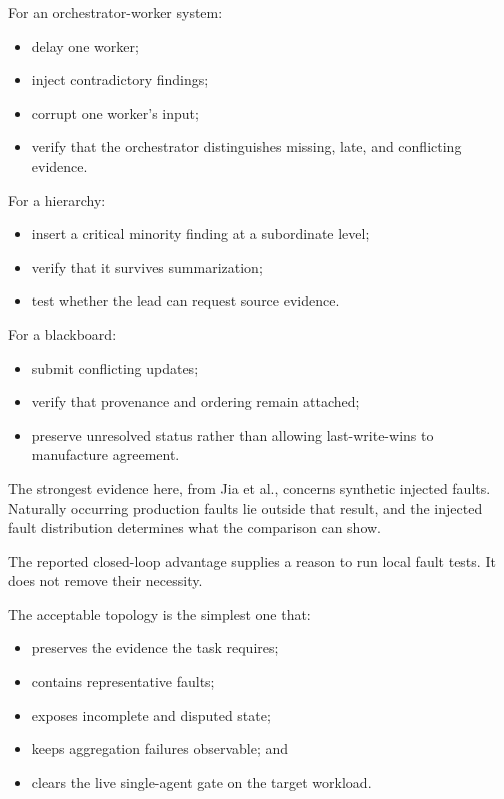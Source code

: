For an orchestrator-worker system:

\begin{itemize}
\tightlist
\item
  delay one worker;
\item
  inject contradictory findings;
\item
  corrupt one worker's input;
\item
  verify that the orchestrator distinguishes missing, late, and conflicting evidence.
\end{itemize}

For a hierarchy:

\begin{itemize}
\tightlist
\item
  insert a critical minority finding at a subordinate level;
\item
  verify that it survives summarization;
\item
  test whether the lead can request source evidence.
\end{itemize}

For a blackboard:

\begin{itemize}
\tightlist
\item
  submit conflicting updates;
\item
  verify that provenance and ordering remain attached;
\item
  preserve unresolved status rather than allowing last-write-wins to manufacture agreement.
\end{itemize}

The strongest evidence here, from Jia et al., concerns synthetic injected faults. Naturally occurring production faults lie outside that result, and the injected fault distribution determines what the comparison can show.

The reported closed-loop advantage supplies a reason to run local fault tests. It does not remove their necessity.

The acceptable topology is the simplest one that:

\begin{itemize}
\tightlist
\item
  preserves the evidence the task requires;
\item
  contains representative faults;
\item
  exposes incomplete and disputed state;
\item
  keeps aggregation failures observable; and
\item
  clears the live single-agent gate on the target workload.
\end{itemize}

